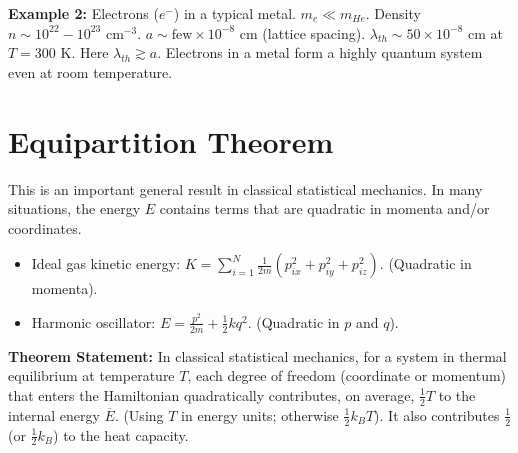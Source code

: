 \documentclass[11pt]{article}
\newcommand{\avg}[1]{\overline{#1}}
\newcommand{\kb}{k_B} %
\newcommand{\lambdaT}{\lambda_{th}} %
\begin{document}
\textbf{Example 2:} Electrons ($e^-$) in a typical metal.
$m_e \ll m_{He}$. Density $n \sim 10^{22} - 10^{23}$ cm$^{-3}$. $a \sim \text{few} \times 10^{-8}$ cm (lattice spacing).
$\lambdaT \sim 50 \times 10^{-8}$ cm at $T=300$ K.
Here $\lambdaT \gtrsim a$. Electrons in a metal form a highly quantum system even at room temperature.

\section*{Equipartition Theorem}

This is an important general result in classical statistical mechanics.
In many situations, the energy $E$ contains terms that are quadratic in momenta and/or coordinates.
\begin{itemize}
    \item Ideal gas kinetic energy: $K = \sum_{i=1}^N \frac{1}{2m} (p_{ix}^2 + p_{iy}^2 + p_{iz}^2)$. (Quadratic in momenta).
    \item Harmonic oscillator: $E = \frac{p^2}{2m} + \frac{1}{2} k q^2$. (Quadratic in $p$ and $q$).
\end{itemize}

\textbf{Theorem Statement:} In classical statistical mechanics, for a system in thermal equilibrium at temperature $T$, each degree of freedom (coordinate or momentum) that enters the Hamiltonian quadratically contributes, on average, $\frac{1}{2}T$ to the internal energy $\avg{E}$. (Using $T$ in energy units; otherwise $\frac{1}{2} \kb T$). It also contributes $\frac{1}{2}$ (or $\frac{1}{2}\kb$) to the heat capacity.
\end{document}
